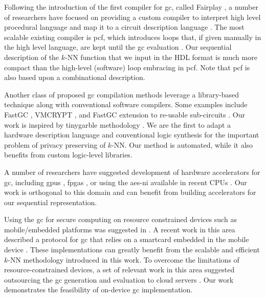 Following the introduction of the first compiler for \acrshort{gc}, called Fairplay \cite{malkhi2004fairplay}, a number of researchers have focused on providing a custom compiler to interpret high level procedural language and map it to a circuit description language \cite{henecka2010tasty,holzer2012secure}.
The most scalable existing compiler is \gls{pcf}, which introduces loops that, if given manually in the high level language, are kept until the \acrshort{gc} evaluation \cite{kreuter2013pcf}.
Our sequential description of the $k$-NN function that we input in the HDL format is much more compact than the high-level (software) loop embracing in \gls{pcf}.
Note that \gls{pcf} is also based upon a combinational description.

Another class of proposed \acrshort{gc} compilation methods leverage a library-based technique along with conventional software compilers.
Some examples include FastGC \cite{huang2011faster}, VMCRYPT \cite{malka2011vmcrypt}, and FastGC extension to re-usable sub-circuits \cite{henecka2013faster}.
Our work is inspired by \gls{tinygarble} methodology \cite{songhori2015tinygarble}.
We are the first to adapt a hardware description language and conventional logic synthesis for the important problem of privacy preserving of $k$-NN.
Our method is automated, while it also benefits from custom logic-level libraries.

A number of researchers have suggested development of hardware accelerators for \acrshort{gc}, including \acrshort{gpu}s \cite{husted2013gpu,pu2013computing}, \acrshort{fpga}s \cite{jarvinen2010garbled}, or using the \acrshort{aes-ni} available in recent CPUs \cite{bellare2013efficient}.
Our work is orthogonal to this domain and can benefit from building accelerators for our sequential representation.

Using the \acrshort{gc} for secure computing on resource constrained devices such as mobile/embedded platforms was suggested in \cite{huang2011privacy}.
A recent work in this area described a protocol for \acrshort{gc} that relies on a smartcard embedded in the mobile device \cite{demmler2014ad}.
These implementations can greatly benefit from the scalable and efficient $k$-NN methodology introduced in this work.
To overcome the limitations of resource-constrained devices, a set of relevant work in this area suggested outsourcing the \acrshort{gc} generation and evaluation to cloud servers \cite{carter2016secure,carter2014whitewash}.
Our work demonstrates the feasibility of on-device \acrshort{gc} implementation.

